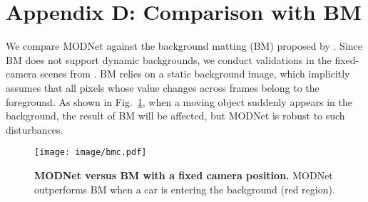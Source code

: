 \documentclass[letterpaper]{article} \usepackage{aaai22}  \usepackage{times}  \usepackage{helvet}  \usepackage{courier}  \usepackage[hyphens]{url}  \usepackage{graphicx} \urlstyle{rm} \def\UrlFont{\rm}  \usepackage{natbib}  \usepackage{caption} \usepackage{booktabs}
\begin{document}
\section*{Appendix D: Comparison with BM}
We compare MODNet against the background matting (BM) proposed by \cite{BM}. Since BM does not support dynamic backgrounds, we conduct validations in the fixed-camera scenes from \cite{BM}. BM relies on a static background image, which implicitly assumes that all pixels whose value changes across frames belong to the foreground. As shown in Fig.~\ref{fig:bmc}, when a moving object suddenly appears in the background, the result of BM will be affected, but MODNet is robust to such disturbances.

\begin{figure}[t]
\begin{center}
  \texttt{[image: image/bmc.pdf]}
\end{center}
  \caption{\textbf{MODNet versus BM with a fixed camera position.} MODNet outperforms BM \cite{BM} when a car is entering the background (red region).
  }
\label{fig:bmc}
\end{figure}



\end{document}
